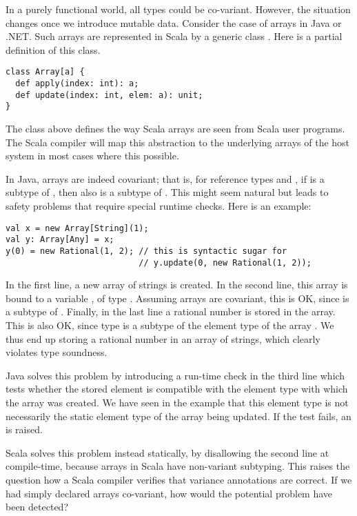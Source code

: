 In a purely functional world, all types could be co-variant. However,
the situation changes once we introduce mutable data. Consider the
case of arrays in Java or .NET. Such arrays are represented in Scala
by a generic class . Here is a partial definition of this
class.
\begin{lstlisting}
class Array[a] {
  def apply(index: int): a;
  def update(index: int, elem: a): unit;
}
\end{lstlisting}
The class above defines the way Scala arrays are seen from Scala user
programs. The Scala compiler will map this abstraction to the
underlying arrays of the host system in most cases where this
possible.

In Java, arrays are indeed covariant; that is, for reference types
 and , if  is a subtype of , then also
 is a subtype of . This might seem
natural but leads to safety problems that require special runtime
checks. Here is an example:
\begin{lstlisting}
val x = new Array[String](1);
val y: Array[Any] = x;
y(0) = new Rational(1, 2); // this is syntactic sugar for 
                           // y.update(0, new Rational(1, 2));
\end{lstlisting}
In the first line, a new array of strings is created. In the second
line, this array is bound to a variable , of type
.  Assuming arrays are covariant, this is OK, since
 is a subtype of . Finally, in
the last line a rational number is stored in the array. This is also
OK, since type  is a subtype of the element type
 of the array . We thus end up storing a rational
number in an array of strings, which clearly violates type soundness. 

Java solves this problem by introducing a run-time check in the third
line which tests whether the stored element is compatible with the
element type with which the array was created. We have seen in the
example that this element type is not necessarily the static element
type of the array being updated. If the test fails, an
 is raised.

Scala solves this problem instead statically, by disallowing the
second line at compile-time, because arrays in Scala have non-variant
subtyping. This raises the question how a Scala compiler verifies that
variance annotations are correct. If we had simply declared arrays
co-variant, how would the potential problem have been detected?


